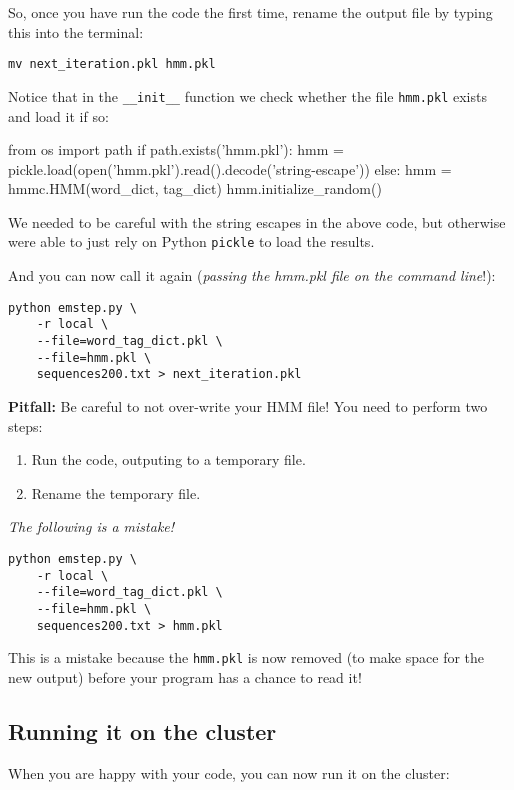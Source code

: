 So, once you have run the code the first time, rename the output file by typing this into the terminal:

\begin{verbatim}
mv next_iteration.pkl hmm.pkl
\end{verbatim}

Notice that in the \verb+__init__+ function we check whether the file \verb+hmm.pkl+ exists and load it if so:

\begin{python}
from os import path
if path.exists('hmm.pkl'):
    hmm = pickle.load(open('hmm.pkl').read().decode('string-escape'))
else:
    hmm = hmmc.HMM(word_dict, tag_dict)
    hmm.initialize_random()
\end{python}

We needed to be careful with the string escapes in the above code, but
otherwise were able to just rely on Python \verb+pickle+ to load the results.

And you can now call it again (\emph{passing the hmm.pkl file on the command
line}!):

\begin{verbatim}
python emstep.py \
    -r local \
    --file=word_tag_dict.pkl \
    --file=hmm.pkl \
    sequences200.txt > next_iteration.pkl
\end{verbatim}

\textbf{Pitfall:} Be careful to not over-write your HMM file! You need to
perform two steps:

\begin{enumerate}
\item Run the code, outputing to a temporary file.
\item Rename the temporary file.
\end{enumerate}

\emph{The following is a mistake!}
\begin{verbatim}
python emstep.py \
    -r local \
    --file=word_tag_dict.pkl \
    --file=hmm.pkl \
    sequences200.txt > hmm.pkl
\end{verbatim}

This is a mistake because the \verb+hmm.pkl+ is now removed (to make space for
the new output) before your program has a chance to read it!

\subsection{Running it on the cluster}

When you are happy with your code, you can now run it on the cluster:

